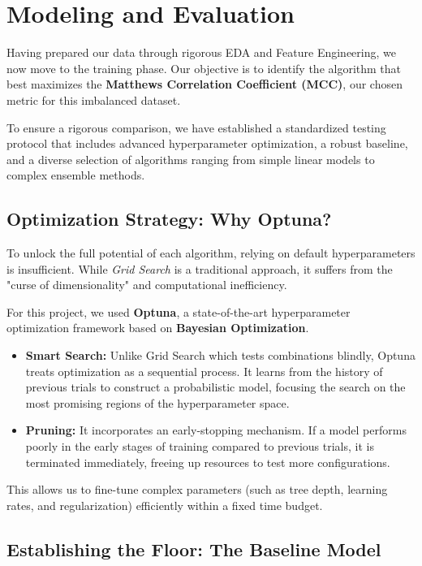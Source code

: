 \thispagestyle{plain}

\chapter{Modeling and Evaluation}
\label{cp:mae}
\vspace{1\baselineskip}


Having prepared our data through rigorous EDA and Feature Engineering, we now move to the training phase. Our objective is to identify
the algorithm that best maximizes the \textbf{Matthews Correlation Coefficient (MCC)}, our chosen metric for this imbalanced dataset.

To ensure a rigorous comparison, we have established a standardized testing protocol that includes advanced hyperparameter optimization,
a robust baseline, and a diverse selection of algorithms ranging from simple linear models to complex ensemble methods.

\section{Optimization Strategy: Why Optuna?}

To unlock the full potential of each algorithm, relying on default hyperparameters is insufficient. While \textit{Grid Search}
is a traditional approach, it suffers from the "curse of dimensionality" and computational inefficiency.

For this project, we used \textbf{Optuna}, a state-of-the-art hyperparameter optimization framework based on \textbf{Bayesian Optimization}.
\begin{itemize}
    \item \textbf{Smart Search:} Unlike Grid Search which tests combinations blindly, Optuna treats optimization as a sequential process.
    It learns from the history of previous trials to construct a probabilistic model, focusing the search on the most promising regions of the
    hyperparameter space.
    \item \textbf{Pruning:} It incorporates an early-stopping mechanism. If a model performs poorly in the early stages of training compared
    to previous trials, it is terminated immediately, freeing up resources to test more configurations.
\end{itemize}
This allows us to fine-tune complex parameters (such as tree depth, learning rates, and regularization) efficiently within a fixed time budget.

\section{Establishing the Floor: The Baseline Model}


